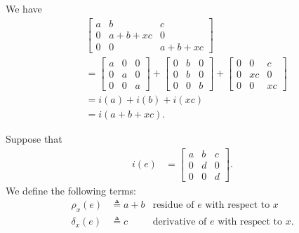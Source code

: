 \documentclass[a4paper,UKenglish,cleveref, autoref, thm-restate]{lipics-v2021}
\begin{document}
\begin{proofEnd}
  We have
  \begin{align*}
    &
    \begin{bmatrix}
      a & b & c \\
      0 & a+b+xc & 0 \\
      0 & 0 & a+b+xc
    \end{bmatrix}
    \\
    & =
      \begin{bmatrix}
        a & 0 & 0 \\
        0 & a & 0 \\
        0 & 0 & a
      \end{bmatrix}
      +
      \begin{bmatrix}
        0 & b & 0 \\
        0 & b & 0 \\
        0 & 0 & b
      \end{bmatrix}
      +
      \begin{bmatrix}
        0 & 0 & c \\
        0 & xc & 0 \\
        0 & 0 & xc
      \end{bmatrix}
    \\
    & = i(a) + i(b) + i(xc)
    \\
    & = i(a+b+xc).
  \end{align*}
\end{proofEnd}


\begin{definition}
  \label{def:derivative}
  Suppose that
  \begin{align*}
    i(e)
    & =
      \begin{bmatrix}
        a & b & c \\
        0 & d & 0 \\
        0 & 0 & d
      \end{bmatrix}.
  \end{align*}
  We define the following terms:
  \begin{align*}
     \rho _x(e) &  \triangleq  a + b & \text{residue of $e$ with respect to $x$} \\
     \delta _x(e) &  \triangleq  c & \text{derivative of $e$ with respect to $x$}.
  \end{align*}
\end{definition}
\end{document}
